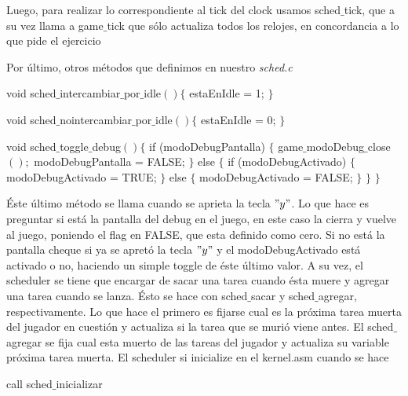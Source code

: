 Luego, para realizar lo correspondiente al tick del clock usamos sched$\_$tick, que a su vez llama a game$\_$tick que sólo actualiza todos los relojes, en concordancia a lo que pide el ejercicio


Por \'ultimo, otros m\'etodos que definimos en nuestro \textit{sched.c}
\begin{algorithmic}
    \State \tab void sched$\_$intercambiar$\_$por$\_$idle$() \{$
        \State \tab \tab estaEnIdle = 1;
    \State \tab $\}$
\end{algorithmic}

\begin{algorithmic}
    \State \tab void sched$\_$nointercambiar$\_$por$\_$idle$() \{$
        \State \tab \tab estaEnIdle = 0;
    \State \tab $\}$
\end{algorithmic}

\begin{algorithmic}
    \State \tab void sched$\_$toggle$\_$debug$() \{$
        \State \tab \tab if (modoDebugPantalla) $\{$
        \State \tab \tab \tab game$\_$modoDebug$\_$close$();$
        \State \tab \tab \tab modoDebugPantalla = FALSE;
        \State \tab \tab $\}$ else $\{$
        \State \tab \tab \tab if (modoDebugActivado) $\{$
        \State \tab \tab \tab \tab modoDebugActivado = TRUE;
        \State \tab \tab \tab $\}$ else $\{$
        \State \tab \tab \tab \tab modoDebugActivado = FALSE;
        \State \tab \tab	\tab $\}$
        \State \tab \tab $\}$
    \State \tab $\}$
\end{algorithmic}

Éste último método se llama cuando se aprieta la tecla $"y"$. Lo que hace es preguntar si está la pantalla del debug en el juego, en este caso la cierra y vuelve al juego, poniendo el flag en FALSE, que esta definido como cero. Si no está la pantalla cheque si ya se apretó la tecla $"y"$ y el modoDebugActivado está activado o no, haciendo un simple toggle de éste último valor.
\newline
A su vez, el scheduler se tiene que encargar de sacar una tarea cuando ésta muere y agregar una tarea cuando se lanza. Ésto se hace con sched$\_$sacar y sched$\_$agregar, respectivamente. Lo que hace el primero es fijarse cual es la próxima tarea muerta del jugador en cuestión y actualiza si la tarea que se murió viene antes. El sched$\_$agregar se fija cual esta muerto de las tareas del jugador y actualiza su variable próxima tarea muerta.
\newline
El scheduler si inicialize en el kernel.asm cuando se hace
\begin{algorithmic}
\State call sched$\_$inicializar
\end{algorithmic}


